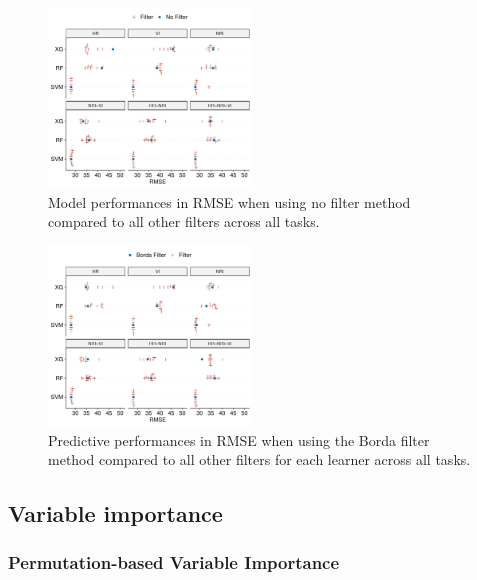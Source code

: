 \documentclass[letterpaper, peerreview, draftcls]{IEEEtran}
\begin{document}
\begin{figure} [t!]
	\centering
	\begin{center}
		\includegraphics[width=0.48\textwidth] {filter-effect-all-vs-no-filter-1.pdf}
		\caption{Model performances in RMSE when using no filter method compared to all other filters across all tasks.}\label{fig:filter-effects-no-filter}
	\end{center}
\end{figure}

\begin{figure} [t!]
	\centering
	\begin{center}
		\includegraphics[width=0.48\textwidth] {filter-effect-all-vs-borda-filter-1.pdf}
		\caption{Predictive performances in RMSE when using the Borda filter method compared to all other filters for each learner across all tasks.}\label{fig:filter-effects-borda}
	\end{center}
\end{figure}

\subsection{Variable importance}

\subsubsection{Permutation-based Variable Importance}
\end{document}
